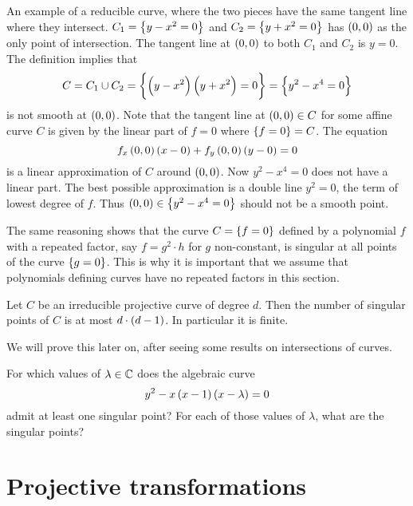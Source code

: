 
\begin{example*}
An example of a reducible curve, where the two pieces have the same tangent line where they intersect. $ C_1 = \cbr{y - x^2 = 0} $ and $ C_2 = \cbr{y + x^2 = 0} $ has $ \br{0, 0} $ as the only point of intersection. The tangent line at $ \br{0, 0} $ to both $ C_1 $ and $ C_2 $ is $ y = 0 $. The definition implies that
$$ C = C_1 \cup C_2 = \cbr{\br{y - x^2}\br{y + x^2} = 0} = \cbr{y^2 - x^4 = 0} $$
is not smooth at $ \br{0, 0} $. Note that the tangent line at $ \br{0, 0} \in C $ for some affine curve $ C $ is given by the linear part of $ f = 0 $ where $ \cbr{f = 0} = C $. The equation
$$ f_x\br{0, 0}\br{x - 0} + f_y\br{0, 0}\br{y - 0} = 0 $$
is a linear approximation of $ C $ around $ \br{0, 0} $. Now $ y^2 - x^4 = 0 $ does not have a linear part. The best possible approximation is a double line $ y^2 = 0 $, the term of lowest degree of $ f $. Thus $ \br{0, 0} \in \cbr{y^2 - x^4 = 0} $ should not be a smooth point.
\end{example*}

\begin{remark}
The same reasoning shows that the curve $ C = \cbr{f = 0} $ defined by a polynomial $ f $ with a repeated factor, say $ f = g^2 \cdot h $ for $ g $ non-constant, is singular at all points of the curve $ \cbr{g = 0} $. This is why it is important that we assume that polynomials defining curves have no repeated factors in this section.
\end{remark}

\begin{theorem}
\label{thm:7.11}
Let $ C $ be an irreducible projective curve of degree $ d $. Then the number of singular points of $ C $ is at most $ d \cdot \br{d - 1} $. In particular it is finite.
\end{theorem}

We will prove this later on, after seeing some results on intersections of curves.

\begin{exercise**}
For which values of $ \lambda \in \mathbb{C} $ does the algebraic curve
$$ y^2 - x\br{x - 1}\br{x - \lambda} = 0 $$
admit at least one singular point? For each of those values of $ \lambda $, what are the singular points?
\end{exercise**}

\pagebreak

\section{Projective transformations}

